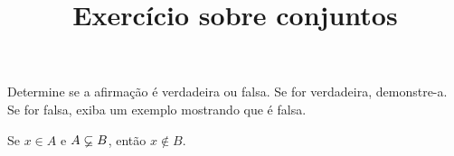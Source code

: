 \documentclass{beamer}
\title{Exercício sobre conjuntos}
\author[\autor]{\autor}
\institute[\instituto]{\instituto}
\date{}
\begin{document}
    \begin{frame}
        \maketitle
    \end{frame}


    \begin{frame}
        \begin{exercicio}
            Determine se a afirma\c{c}\~ao \'e verdadeira ou falsa. Se for verdadeira, demonstre-a. Se for falsa, exiba um
            exemplo mostrando que \'e falsa.
            \begin{center}
                Se $x \in A$ e $A \varsubsetneq B$, ent\~ao $x \notin B$.
            \end{center}
        \end{exercicio}

        \vspace{6cm}
    \end{frame}
\end{document}
